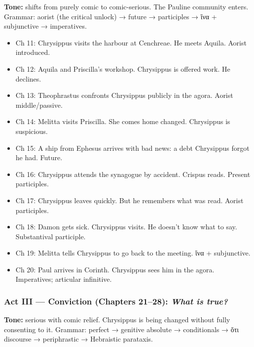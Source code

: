 \documentclass[a4paper]{report}
\begin{document}
\textbf{Tone:} shifts from purely comic to comic-serious. The Pauline
community enters. Grammar: aorist (the critical unlock) → future →
participles → ἵνα + subjunctive → imperatives.

\begin{itemize}
\tightlist
\item
  Ch 11: Chrysippus visits the harbour at Cenchreae. He meets Aquila.
  Aorist introduced.
\item
  Ch 12: Aquila and Priscilla's workshop. Chrysippus is offered work. He
  declines.
\item
  Ch 13: Theophrastus confronts Chrysippus publicly in the agora. Aorist
  middle/passive.
\item
  Ch 14: Melitta visits Priscilla. She comes home changed. Chrysippus is
  suspicious.
\item
  Ch 15: A ship from Ephesus arrives with bad news: a debt Chrysippus
  forgot he had. Future.
\item
  Ch 16: Chrysippus attends the synagogue by accident. Crispus reads.
  Present participles.
\item
  Ch 17: Chrysippus leaves quickly. But he remembers what was read.
  Aorist participles.
\item
  Ch 18: Damon gets sick. Chrysippus visits. He doesn't know what to
  say. Substantival participle.
\item
  Ch 19: Melitta tells Chrysippus to go back to the meeting. ἵνα +
  subjunctive.
\item
  Ch 20: Paul arrives in Corinth. Chrysippus sees him in the agora.
  Imperatives; articular infinitive.
\end{itemize}

\subsubsection{\texorpdfstring{Act III --- Conviction (Chapters 21--28):
\emph{What is
true?}}{Act III --- Conviction (Chapters 21--28): What is true?}}\label{act-iii-conviction-chapters-2128-what-is-true}

\textbf{Tone:} serious with comic relief. Chrysippus is being changed
without fully consenting to it. Grammar: perfect → genitive absolute →
conditionals → ὅτι discourse → periphrastic → Hebraistic parataxis.
\end{document}
